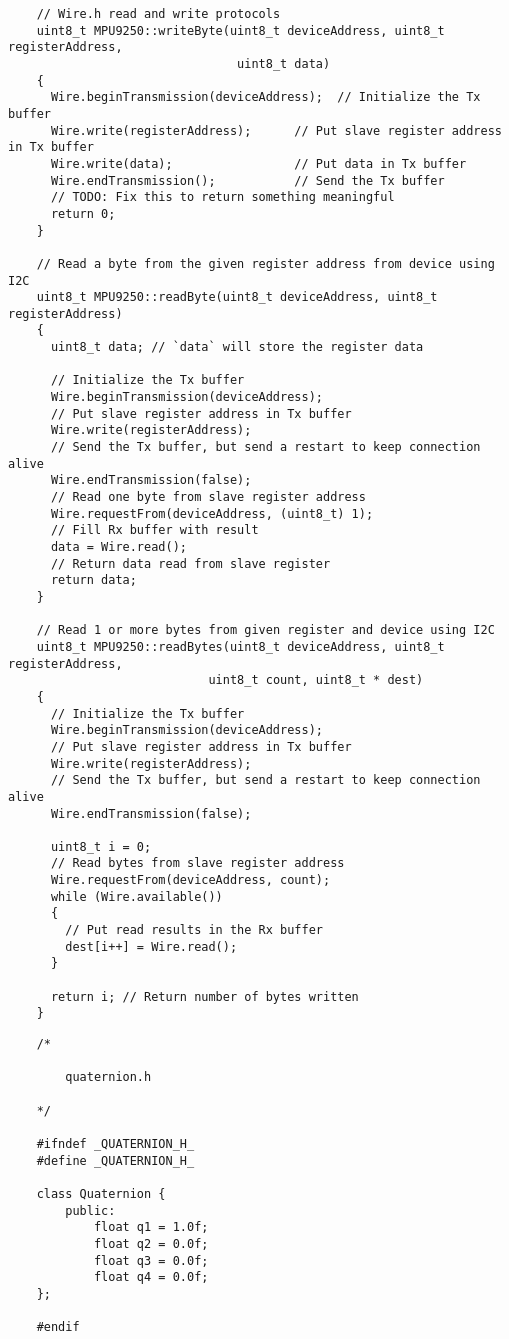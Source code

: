 \begin{lstlisting}
	// Wire.h read and write protocols
	uint8_t MPU9250::writeByte(uint8_t deviceAddress, uint8_t registerAddress,
	                            uint8_t data)
	{
	  Wire.beginTransmission(deviceAddress);  // Initialize the Tx buffer
	  Wire.write(registerAddress);      // Put slave register address in Tx buffer
	  Wire.write(data);                 // Put data in Tx buffer
	  Wire.endTransmission();           // Send the Tx buffer
	  // TODO: Fix this to return something meaningful
	  return 0;
	}

	// Read a byte from the given register address from device using I2C
	uint8_t MPU9250::readByte(uint8_t deviceAddress, uint8_t registerAddress)
	{
	  uint8_t data; // `data` will store the register data

	  // Initialize the Tx buffer
	  Wire.beginTransmission(deviceAddress);
	  // Put slave register address in Tx buffer
	  Wire.write(registerAddress);
	  // Send the Tx buffer, but send a restart to keep connection alive
	  Wire.endTransmission(false);
	  // Read one byte from slave register address
	  Wire.requestFrom(deviceAddress, (uint8_t) 1);
	  // Fill Rx buffer with result
	  data = Wire.read();
	  // Return data read from slave register
	  return data;
	}

	// Read 1 or more bytes from given register and device using I2C
	uint8_t MPU9250::readBytes(uint8_t deviceAddress, uint8_t registerAddress,
	                        uint8_t count, uint8_t * dest)
	{
	  // Initialize the Tx buffer
	  Wire.beginTransmission(deviceAddress);
	  // Put slave register address in Tx buffer
	  Wire.write(registerAddress);
	  // Send the Tx buffer, but send a restart to keep connection alive
	  Wire.endTransmission(false);

	  uint8_t i = 0;
	  // Read bytes from slave register address
	  Wire.requestFrom(deviceAddress, count);
	  while (Wire.available())
	  {
	    // Put read results in the Rx buffer
	    dest[i++] = Wire.read();
	  }

	  return i; // Return number of bytes written
	}

	\end{lstlisting}


	\begin{lstlisting}
	/*

		quaternion.h

	*/

	#ifndef _QUATERNION_H_
	#define _QUATERNION_H_

	class Quaternion {
		public:
			float q1 = 1.0f; 
			float q2 = 0.0f;
			float q3 = 0.0f;
			float q4 = 0.0f;
	};

	#endif
	\end{lstlisting}

